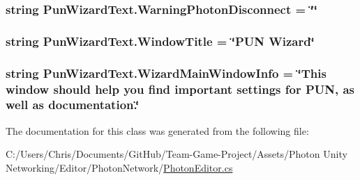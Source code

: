 \subsubsection[{\texorpdfstring{Warning\+Photon\+Disconnect}{WarningPhotonDisconnect}}]{\setlength{\rightskip}{0pt plus 5cm}string Pun\+Wizard\+Text.\+Warning\+Photon\+Disconnect = \char`\"{}\char`\"{}}\hypertarget{class_pun_wizard_text_a6e14ed66c0cf054099da066b0ff51cd3}{}\label{class_pun_wizard_text_a6e14ed66c0cf054099da066b0ff51cd3}
\subsubsection[{\texorpdfstring{Window\+Title}{WindowTitle}}]{\setlength{\rightskip}{0pt plus 5cm}string Pun\+Wizard\+Text.\+Window\+Title = \char`\"{}P\+UN Wizard\char`\"{}}\hypertarget{class_pun_wizard_text_aa2243e01e25e6c918919d3a493c0ea57}{}\label{class_pun_wizard_text_aa2243e01e25e6c918919d3a493c0ea57}
\subsubsection[{\texorpdfstring{Wizard\+Main\+Window\+Info}{WizardMainWindowInfo}}]{\setlength{\rightskip}{0pt plus 5cm}string Pun\+Wizard\+Text.\+Wizard\+Main\+Window\+Info = \char`\"{}This window should help you find important settings for P\+UN, as well as documentation.\char`\"{}}\hypertarget{class_pun_wizard_text_ac25c43cc0f3bc50da2fc3ce8dec0ca56}{}\label{class_pun_wizard_text_ac25c43cc0f3bc50da2fc3ce8dec0ca56}


The documentation for this class was generated from the following file\+:\begin{DoxyCompactItemize}
\item 
C\+:/\+Users/\+Chris/\+Documents/\+Git\+Hub/\+Team-\/\+Game-\/\+Project/\+Assets/\+Photon Unity Networking/\+Editor/\+Photon\+Network/\hyperlink{_photon_editor_8cs}{Photon\+Editor.\+cs}\end{DoxyCompactItemize}
